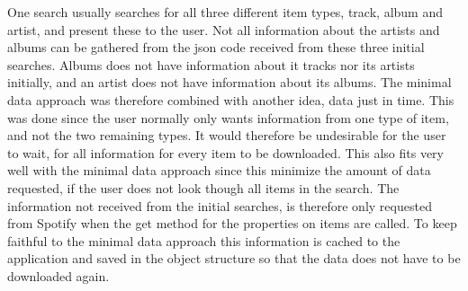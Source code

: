 One search usually searches for all three different item types, track, album and artist, and present these to the user. Not all information about the artists and albums can be gathered from the json code received from these three initial searches. Albums does not have information about it tracks nor its artists initially, and an artist does not have information about its albums. The minimal data approach was therefore combined with another idea, data just in time. This was done since the user normally only wants information from one type of item, and not the two remaining types. It would therefore be undesirable for the user to wait, for all information for every item to be downloaded. This also fits very well with the minimal data approach since this minimize the amount of data requested, if the user does not look though all items in the search. The information not received from the initial searches, is therefore only requested from Spotify when the get method for the properties on items are called. To keep faithful to the minimal data approach this information is cached to the application and saved in the object structure so that the data does not have to be downloaded again.
